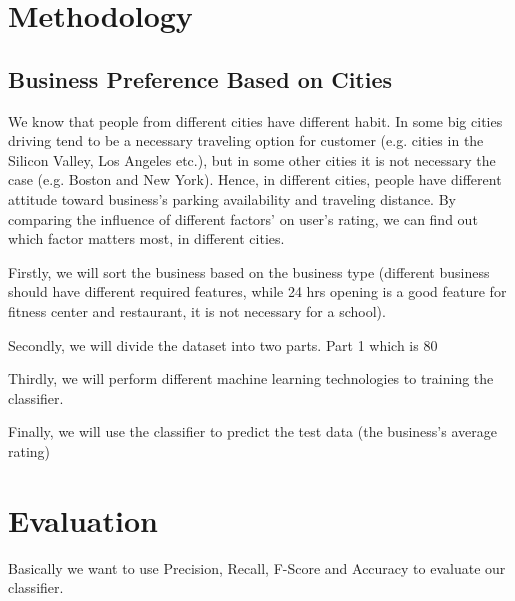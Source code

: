 \documentclass{article}
\begin{document}
\section{Methodology} 

\subsection{Business Preference Based on Cities}
We know that people from different cities have different habit. In some big cities driving tend to be a necessary traveling option for customer (e.g. cities in the Silicon Valley, Los Angeles etc.), but in some other cities it is not necessary the case (e.g. Boston and New York). Hence, in different cities, people have different attitude toward business's parking availability and traveling distance. By comparing the influence of different factors' on user's rating, we can find out which factor matters most, in different cities.

Firstly, we will sort the business based on the business type (different business should have different required features, while 24 hrs opening  is a good feature for fitness center and restaurant, it is not necessary for a school).

Secondly, we will divide the dataset into two parts. Part 1 which is 80%

Thirdly, we will perform different machine learning technologies to training the classifier.

Finally, we will use the classifier to predict the test data (the business's average rating)

\section{Evaluation}
Basically we want to use Precision, Recall, F-Score and Accuracy to evaluate our classifier. 
\end{document}
